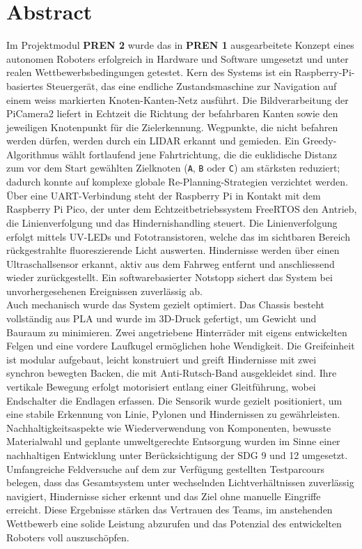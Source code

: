 \documentclass[main.tex]{subfiles} %
\begin{document}
\section*{Abstract}

Im Projektmodul \textbf{PREN 2} wurde das in \textbf{PREN 1} ausgearbeitete
Konzept eines autonomen Roboters erfolgreich in Hardware und Software
umgesetzt und unter realen Wettbewerbsbedingungen getestet.
Kern des Systems ist ein Raspberry-Pi-basiertes Steuergerät, das eine
endliche Zustandsmaschine zur Navigation auf einem weiss markierten
Knoten-Kanten-Netz ausführt. Die Bildverarbeitung der PiCamera2
liefert in Echtzeit die Richtung der befahrbaren Kanten sowie den
jeweiligen Knotenpunkt für die Zielerkennung. Wegpunkte, die nicht befahren
werden dürfen, werden durch ein LIDAR erkannt und gemieden. Ein Greedy-Algorithmus wählt fortlaufend jene Fahrtrichtung,
die die euklidische Distanz zum vor dem Start gewählten Zielknoten
(\texttt{A}, \texttt{B} oder \texttt{C}) am stärksten reduziert; dadurch
konnte auf komplexe globale Re-Planning-Strategien verzichtet werden.\\
Über eine UART-Verbindung steht der Raspberry Pi in Kontakt mit dem Raspberry
Pi Pico, der unter dem Echtzeitbetriebssystem FreeRTOS den Antrieb, die
Linienverfolgung und das Hindernishandling steuert. Die Linienverfolgung erfolgt
mittels UV-LEDs und Fototransistoren, welche das im sichtbaren Bereich rückgestrahlte
fluoreszierende Licht auswerten. Hindernisse werden über einen Ultraschallsensor
erkannt, aktiv aus dem Fahrweg entfernt und anschliessend wieder zurückgestellt.
Ein softwarebasierter Notstopp sichert das System bei unvorhergesehenen
Ereignissen zuverlässig ab.\\
Auch mechanisch wurde das System gezielt optimiert. Das Chassis besteht 
vollständig aus PLA und wurde im 3D-Druck gefertigt, um Gewicht und Bauraum 
zu minimieren. Zwei angetriebene Hinterräder mit eigens entwickelten Felgen 
und eine vordere Laufkugel ermöglichen hohe Wendigkeit. Die Greifeinheit 
ist modular aufgebaut, leicht konstruiert und greift Hindernisse mit zwei 
synchron bewegten Backen, die mit Anti-Rutsch-Band ausgekleidet sind. Ihre 
vertikale Bewegung erfolgt motorisiert entlang einer Gleitführung, wobei 
Endschalter die Endlagen erfassen. Die Sensorik wurde gezielt positioniert, 
um eine stabile Erkennung von Linie, Pylonen und Hindernissen zu 
gewährleisten.\\
Nachhaltigkeitsaspekte wie Wiederverwendung von Komponenten, bewusste
Materialwahl und geplante umweltgerechte Entsorgung wurden im Sinne einer
nachhaltigen Entwicklung unter Berücksichtigung der SDG 9 und 12 umgesetzt.\\
Umfangreiche Feldversuche auf dem zur Verfügung gestellten Testparcours belegen,
dass das Gesamtsystem unter wechselnden Lichtverhältnissen zuverlässig
navigiert, Hindernisse sicher erkennt und das Ziel ohne manuelle Eingriffe
erreicht. Diese Ergebnisse stärken das Vertrauen des Teams, im anstehenden
Wettbewerb eine solide Leistung abzurufen und das Potenzial des entwickelten
Roboters voll auszuschöpfen.
\end{document}
